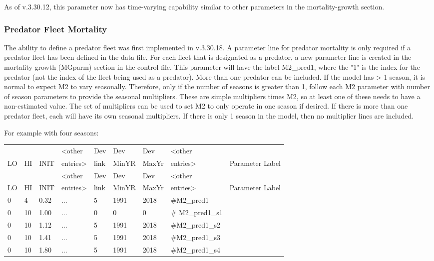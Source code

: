 As of v.3.30.12, this parameter now has time-varying capability similar to other parameters in the mortality-growth section.

\subsubsection{Predator Fleet Mortality}
The ability to define a predator fleet was first implemented in v.3.30.18.  A parameter line for predator mortality is only required if a predator fleet has been defined in the data file. For each fleet that is designated as a predator, a new parameter line is created in the mortality-growth (MGparm) section in the control file. This parameter will have the label M2\_pred1, where the "1" is the index for the predator (not the index of the fleet being used as a predator). More than one predator can be included. If the model has > 1 season, it is normal to expect M2 to vary seasonally. Therefore, only if the number of seasons is greater than 1, follow each M2 parameter with number of season parameters to provide the seasonal multipliers. These are simple multipliers times M2, so at least one of these needs to have a non-estimated value. The set of multipliers can be used to set M2 to only operate in one season if desired. If there is more than one predator fleet, each will have its own seasonal multipliers. If there is only 1 season in the model, then no multiplier lines are included. 

For example with four seasons:
\begin{longtable}{p{1cm} p{1cm} p{1cm}  p{1.5cm}  p{1.1cm}  p{1.1cm} p{1.1cm}  p{1.1cm}  p{6cm}  }
	\hline
	   &    &      &  <other  & Dev  & Dev   & Dev   & <other  & \Tstrut\\
	LO & HI & INIT &  entries>& link & MinYR & MaxYr & entries>&Parameter Label \Bstrut\\
	\hline
	\endfirsthead
	
	\hline
	   &    &      &  <other  & Dev  & Dev   & Dev   & <other  & \Tstrut\\
    LO & HI & INIT &  entries>& link & MinYR & MaxYr & entries>&Parameter Label \Bstrut\\
	\hline
	\endhead
	
	\hline
	\endfoot
	
	\endlastfoot
	
	0 &  4 & 0.32 & ... & 5 & 1991 & 2018 & \#M2\_pred1\Tstrut\\
	0 & 10 & 1.00 & ... & 0 & 0    & 0    & \# M2\_pred1\_s1\\
	0 & 10 & 1.12 & ... & 5 & 1991 & 2018 & \#M2\_pred1\_s2 \\
	0 & 10 & 1.41 & ... & 5 & 1991 & 2018 & \#M2\_pred1\_s3 \\
	0 & 10 & 1.80 & ... & 5 & 1991 & 2018 & \#M2\_pred1\_s4 \Bstrut\\		
	\hline
\end{longtable}

